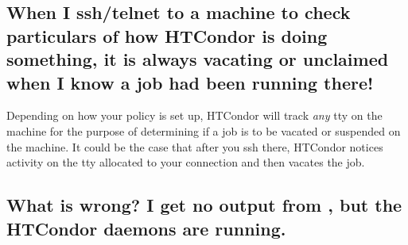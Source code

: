 \subsection*{When I ssh/telnet to a machine to check particulars of how
HTCondor is doing something, it is always vacating or unclaimed when I
know a job had been running there!}

Depending on how your policy is set up, HTCondor will track \emph{any} tty
on the machine for the purpose of determining if a job is to be vacated
or suspended on the machine. It could be the case that after you ssh
there, HTCondor notices activity on the tty allocated to your connection
and then vacates the job.

\subsection*{What is wrong? I get no output from , but the HTCondor daemons are running.}

